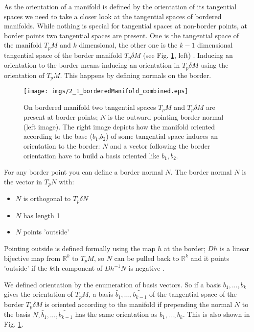  As the orientation of a manifold is defined by the orientation of its tangential spaces we need to take a closer look at the tangential spaces of bordered manifolds.
While nothing is special for tangential spaces at non-border points, at border points two tangential spaces are present. One is the tangential space of the manifold $T_pM$ and $k$ dimensional, the other one is the $k-1$ dimensional tangential space of the border manifold $T_p \delta M$ (see Fig. \ref{fig::2_1_borderManifold}, left) . Inducing an orientation to the border means inducing an orientation in $T_p\delta M$ using the orientation of $T_p M$. This happens by defining normals on the border.

\begin{figure}
\begin{center}
\texttt{[image: imgs/2\_1\_borderedManifold\_combined.eps]}
\end{center}
\label{fig::2_1_borderManifold}
\caption{On bordered manifold two tangential spaces $T_pM$ and $T_p\delta M$  are present at border points; $N$ is the outward pointing border normal (left image). The right image depicts how the manifold oriented according to the base ($b_1$,$b_2$) of some tangential space induces an orientation to the border: $N$ and a vector following the border orientation have to build a basis oriented like $b_1,b_2$.}
\end{figure}

For any border point you can define a border normal $N$. The border normal $N$ is the vector in $T_p N$ with:
\begin{itemize}
\item $N$ is orthogonal to $T_p \delta N$
\item $N$ has length 1
\item $N$ points 'outside'
\end{itemize}
Pointing outside is defined formally using the map $h$ at the border; $Dh$ is a linear bijective map from $\mathbb R^k$ to $T_pM$, so $N$ can be pulled back to $\mathbb R^k$ and it points 'outside' if the $k$th component of $Dh^{-1} N$ is negative .

We defined orientation by the enumeration of basis vectors. So if a basis $b_1,...,b_k$ gives the orientation of $T_pM$,
a basis $\widetilde{b_1},...,\widetilde{ b_{k-1}}$ of the tangential space of the border $T_p\delta M$ is oriented according to the manifold if prepending the normal $N$ to the basis $N,\widetilde{b_1},...,\widetilde{ b_{k-1}}$ has the same orientation as $b_1,...,b_k$. This is also shown in Fig. \ref{fig::2_1_borderManifold}.


